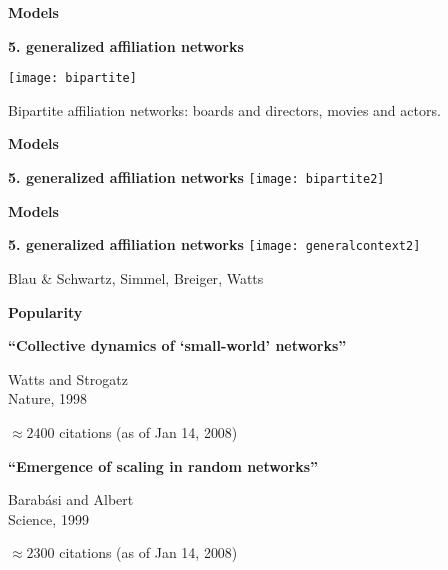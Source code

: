   

  \textbf{Models}

  \textbf{5. generalized affiliation networks}
    \begin{center}
      \texttt{[image: bipartite]}
    \end{center}
  

  Bipartite affiliation networks: boards and directors, movies and actors.


  \textbf{Models}

  \textbf{5. generalized affiliation networks}
    \centering
    \texttt{[image: bipartite2]}
  


  \textbf{Models}

  \textbf{5. generalized affiliation networks}
    \texttt{[image: generalcontext2]}  
    
     Blau \& Schwartz\cite{blau1984a}, Simmel\cite{simmel1902a}, Breiger\cite{breiger1974a}, Watts \etal\cite{watts2002b}
    
  




  \textbf{Popularity}

  \textbf{``Collective dynamics of `small-world' networks''\cite{watts1998a}}
    
     
      Watts and Strogatz\\
      Nature, 1998
     
      \alert{$\approx 2400$} citations {\tiny(as of Jan 14, 2008)}
    
  

  \textbf{``Emergence of scaling in random networks''\cite{barabasi1999a}}
    
     
      Barab\'{a}si and Albert\\
      Science, 1999
     
      \alert{$\approx 2300$} citations {\tiny(as of Jan 14, 2008)}
    
  

